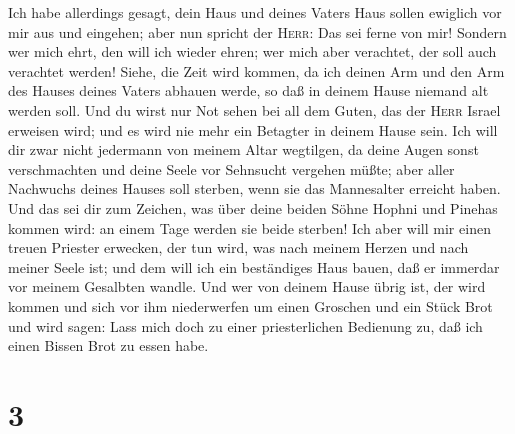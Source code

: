 Ich habe allerdings gesagt, dein Haus und deines Vaters Haus sollen
ewiglich vor mir aus und eingehen; aber nun spricht der \textsc{Herr}:
Das sei ferne von mir! Sondern wer mich ehrt, den will ich wieder ehren;
wer mich aber verachtet, der soll auch verachtet werden! 
Siehe, die Zeit wird kommen, da ich deinen Arm und den Arm des Hauses
deines Vaters abhauen werde, so daß in deinem Hause niemand alt werden
soll.  Und du wirst nur Not sehen bei all dem Guten, das
der \textsc{Herr} Israel erweisen wird; und es wird nie mehr ein
Betagter in deinem Hause sein.  Ich will dir zwar nicht
jedermann von meinem Altar wegtilgen, da deine Augen sonst verschmachten
und deine Seele vor Sehnsucht vergehen müßte; aber aller Nachwuchs
deines Hauses soll sterben, wenn sie das Mannesalter erreicht haben.
 Und das sei dir zum Zeichen, was über deine beiden Söhne
Hophni und Pinehas kommen wird: an einem Tage werden sie beide sterben!
 Ich aber will mir einen treuen Priester erwecken, der
tun wird, was nach meinem Herzen und nach meiner Seele ist; und dem will
ich ein beständiges Haus bauen, daß er immerdar vor meinem Gesalbten
wandle.  Und wer von deinem Hause übrig ist, der wird
kommen und sich vor ihm niederwerfen um einen Groschen und ein Stück
Brot und wird sagen: Lass mich doch zu einer priesterlichen Bedienung
zu, daß ich einen Bissen Brot zu essen habe.

\hypertarget{section-2}{%
\section{3}\label{section-2}}

